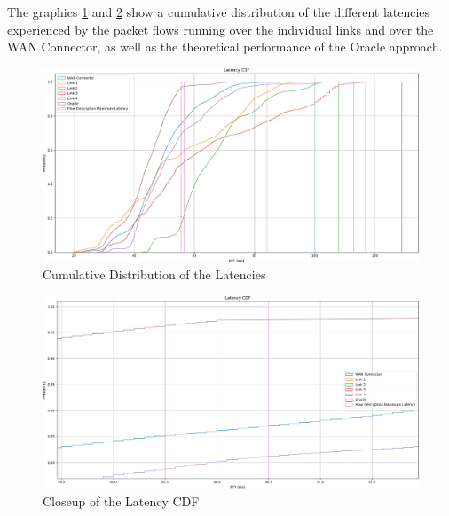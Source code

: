 The graphics \ref{fig:latency_cdf1} and \ref{fig:latency_cdf1_super_zoomed_in} show a cumulative distribution of the different latencies experienced by the packet flows running over the individual links and over the WAN Connector, as well as the theoretical performance of the Oracle approach.
\begin{figure}[h]
    \centering
        \includegraphics[height=0.8\textwidth,width=\textwidth]{fig/latency_cdf1.png}
        \caption{Cumulative Distribution of the Latencies}
        \label{fig:latency_cdf1}
\end{figure}

\begin{figure}[h]
    \centering
        \includegraphics[height=0.66\textwidth,width=\textwidth]{fig/latency_cdf1_super_zoomed_in.png}
        \caption{Closeup of the Latency CDF}
        \label{fig:latency_cdf1_super_zoomed_in}
\end{figure}

